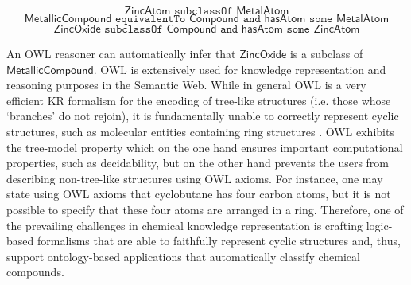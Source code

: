 \documentclass[10pt]{bmc_article}
\newenvironment{bmcformat}{\baselineskip20pt\sloppy\setboolean{publ}{false}}{\baselineskip20pt\sloppy}
\begin{document}
\begin{bmcformat}
\begin{equation} \label{ax:zinc}\mathsf{ZincAtom} \texttt{ subclassOf } \mathsf{MetalAtom}\end{equation} 
\begin{equation}\label{ax:metallic compound}\mathsf{MetallicCompound} \texttt{ equivalentTo } \mathsf{Compound} \texttt{ and } \mathsf{hasAtom} \texttt{ some } \mathsf{MetalAtom}\end{equation}
\begin{equation}\mathsf{ZincOxide} \texttt{ subclassOf } \mathsf{Compound} \texttt{ and } \mathsf{hasAtom}  \texttt{ some } \mathsf{ZincAtom}\end{equation} 
 
An OWL reasoner can automatically infer that $\mathsf{ZincOxide}$ is a subclass of $\mathsf{MetallicCompound}$.
OWL is extensively used for knowledge representation and reasoning purposes in the Semantic Web.%
While in general OWL is a very efficient KR formalism for the encoding of tree-like structures (i.e. those whose `branches' do not rejoin), it is fundamentally unable to correctly represent cyclic structures, such as molecular entities containing ring structures \cite{magka2011}.
OWL exhibits the tree-model property \cite{VardiModalLogic} which on the one hand ensures important computational properties, such as decidability, but on the other hand prevents the users from describing non-tree-like structures using OWL axioms. For instance, one may state using OWL axioms that cyclobutane has four carbon atoms, but it is not possible to specify that these four atoms are arranged in a ring. Therefore, one of the prevailing challenges in chemical knowledge representation is crafting logic-based formalisms that are able to faithfully represent cyclic structures and, thus, support ontology-based applications that automatically classify chemical compounds.


\end{bmcformat}
\end{document}
